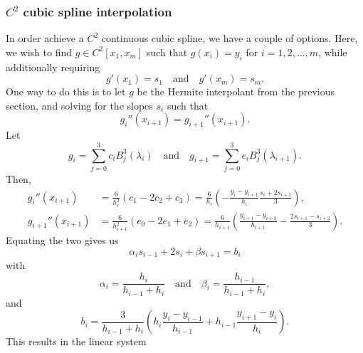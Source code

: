 \subsubsection{\texorpdfstring{$C^2$}{C2} cubic spline interpolation}
In order achieve a $C^2$ continuous cubic spline, we have a couple of options.
Here, we wish to find $g \in C^2[x_1, x_m]$ such that $g(x_i) = y_i$ for $i = 1, 2, \dots, m$, while additionally requiring
\begin{equation}
    g'(x_1) = s_1
    \quad\text{and}\quad
    g'(x_m) = s_m.
\end{equation}
One way to do this is to let $g$ be the Hermite interpolant from the previous section, and solving for the slopes $s_i$ such that
\begin{equation}
    g_i''(x_{i+1}) = g_{i + 1}''(x_{i + 1}).
\end{equation}
Let
\begin{equation}
    g_i = \sum_{j = 0}^{3} c_i B_j^3(\lambda_i)
    \quad\text{and}\quad
    g_{i + 1} = \sum_{j = 0}^{3} e_i B_j^3(\lambda_{i + 1}).
\end{equation}
Then,
\begin{align*}
    g_i''(x_{i + 1}) &= \frac{6}{h_i^2} (c_1 - 2 c_2 + c_3)
    = \frac{6}{h_{i}} \left(-\frac{y_{i} - y_{i + 1}}{h_i} \frac{s_i + 2 s_{i + 1}}{3}\right), \\
    g_{i + 1}''(x_{i + 1}) &= \frac{6}{h_{i + 1}^2} (e_0 - 2 e_1 + e_2)
    = \frac{6}{h_{i + 1}} \left(\frac{y_{i + 1} - y_{i + 2}}{h_{i + 1}} - \frac{2s_{i + 1} - s_{i + 2}}{3}\right).
\end{align*}
Equating the two gives us
\begin{equation}
    \alpha_i s_{i - 1} + 2 s_i + \beta s_{i + 1} = b_i
\end{equation}
with
\begin{equation}
    \alpha_i = \frac{h_i}{h_{i - 1} + h_i}
    \quad\text{and}\quad
    \beta_i = \frac{h_{i-1}}{h_{i - 1} + h_{i}},
\end{equation}
and
\begin{equation}
    b_i = \frac{3}{h_{i - 1} + h_i} \left(
        h_i \frac{y_i - y_{i - 1}}{h_{i - 1}}
        + h_{i - 1} \frac{y_{i + 1} - y_i}{h_i}
    \right).
\end{equation}
This results in the linear system
